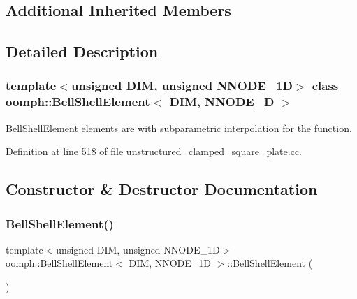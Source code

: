 \subsection*{Additional Inherited Members}


\subsection{Detailed Description}
\subsubsection*{template$<$unsigned D\+IM, unsigned N\+N\+O\+D\+E\+\_\+1D$>$\newline
class oomph\+::\+Bell\+Shell\+Element$<$ D\+I\+M, N\+N\+O\+D\+E\+\_\+D $>$}

\hyperlink{classoomph_1_1BellShellElement}{Bell\+Shell\+Element} elements are with subparametric interpolation for the function. 

Definition at line 518 of file unstructured\+\_\+clamped\+\_\+square\+\_\+plate.\+cc.



\subsection{Constructor \& Destructor Documentation}
\mbox{\label{classoomph_1_1BellShellElement_a9c8946b0c97fc993db62acafc76301d8}} 
\subsubsection{\texorpdfstring{Bell\+Shell\+Element()}{BellShellElement()}\hspace{0.1cm}{\footnotesize\ttfamily [1/2]}}
{\footnotesize\ttfamily template$<$unsigned D\+IM, unsigned N\+N\+O\+D\+E\+\_\+1D$>$ \\
\hyperlink{classoomph_1_1BellShellElement}{oomph\+::\+Bell\+Shell\+Element}$<$ D\+IM, N\+N\+O\+D\+E\+\_\+1D $>$\+::\hyperlink{classoomph_1_1BellShellElement}{Bell\+Shell\+Element} (\begin{DoxyParamCaption}{ }\end{DoxyParamCaption})\hspace{0.3cm}{\ttfamily [inline]}}



